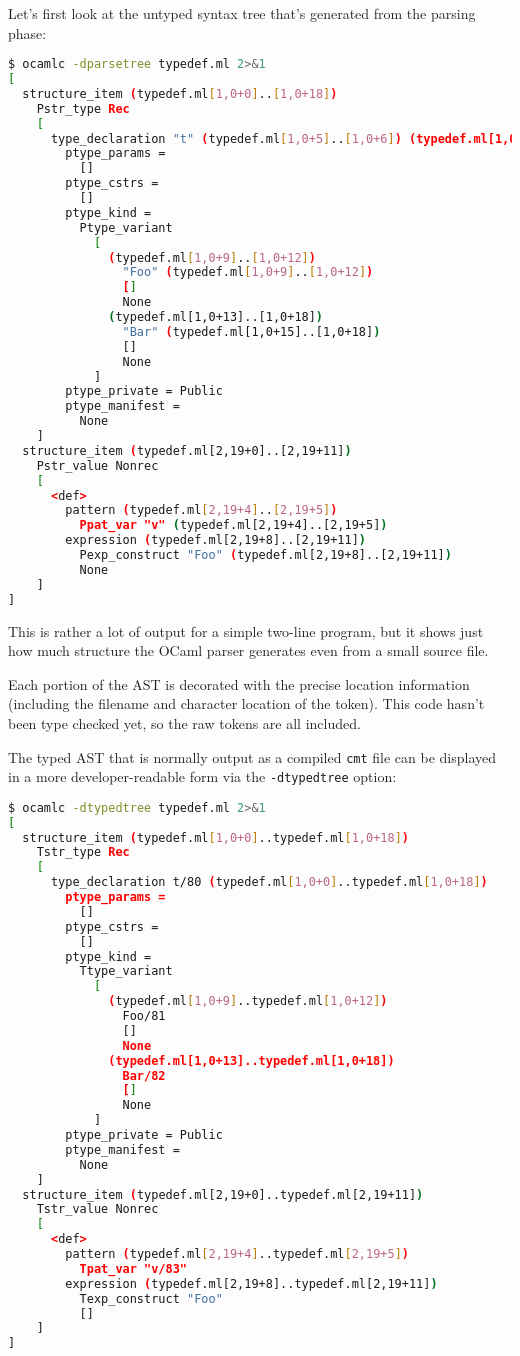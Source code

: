 Let's first look at the untyped syntax tree that's generated from the
parsing phase:

\begin{lstlisting}[language=bash]
$ ocamlc -dparsetree typedef.ml 2>&1
[
  structure_item (typedef.ml[1,0+0]..[1,0+18])
    Pstr_type Rec
    [
      type_declaration "t" (typedef.ml[1,0+5]..[1,0+6]) (typedef.ml[1,0+0]..[1,0+18])
        ptype_params =
          []
        ptype_cstrs =
          []
        ptype_kind =
          Ptype_variant
            [
              (typedef.ml[1,0+9]..[1,0+12])
                "Foo" (typedef.ml[1,0+9]..[1,0+12])
                []
                None
              (typedef.ml[1,0+13]..[1,0+18])
                "Bar" (typedef.ml[1,0+15]..[1,0+18])
                []
                None
            ]
        ptype_private = Public
        ptype_manifest =
          None
    ]
  structure_item (typedef.ml[2,19+0]..[2,19+11])
    Pstr_value Nonrec
    [
      <def>
        pattern (typedef.ml[2,19+4]..[2,19+5])
          Ppat_var "v" (typedef.ml[2,19+4]..[2,19+5])
        expression (typedef.ml[2,19+8]..[2,19+11])
          Pexp_construct "Foo" (typedef.ml[2,19+8]..[2,19+11])
          None
    ]
]
\end{lstlisting}

This is rather a lot of output for a simple two-line program, but it
shows just how much structure the OCaml parser generates even from a
small source file.

Each portion of the AST is decorated with the precise location
information (including the filename and character location of the
token). This code hasn't been type checked yet, so the raw tokens are
all included.

The typed AST that is normally output as a compiled
\passthrough{\lstinline!cmt!} file can be displayed in a more
developer-readable form via the \passthrough{\lstinline!-dtypedtree!}
option:

\begin{lstlisting}[language=bash]
$ ocamlc -dtypedtree typedef.ml 2>&1
[
  structure_item (typedef.ml[1,0+0]..typedef.ml[1,0+18])
    Tstr_type Rec
    [
      type_declaration t/80 (typedef.ml[1,0+0]..typedef.ml[1,0+18])
        ptype_params =
          []
        ptype_cstrs =
          []
        ptype_kind =
          Ttype_variant
            [
              (typedef.ml[1,0+9]..typedef.ml[1,0+12])
                Foo/81
                []
                None
              (typedef.ml[1,0+13]..typedef.ml[1,0+18])
                Bar/82
                []
                None
            ]
        ptype_private = Public
        ptype_manifest =
          None
    ]
  structure_item (typedef.ml[2,19+0]..typedef.ml[2,19+11])
    Tstr_value Nonrec
    [
      <def>
        pattern (typedef.ml[2,19+4]..typedef.ml[2,19+5])
          Tpat_var "v/83"
        expression (typedef.ml[2,19+8]..typedef.ml[2,19+11])
          Texp_construct "Foo"
          []
    ]
]
\end{lstlisting}

